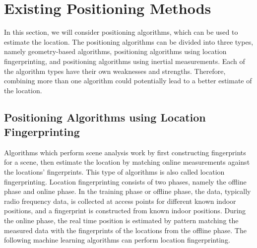 \section{Existing Positioning Methods} \label{sec:existingpositioningmethods}
In this section, we will consider positioning algorithms, which can be used to estimate the location. The positioning algorithms can be divided into three types, namely geometry-based algorithms, positioning algorithms using location fingerprinting, and positioning algorithms using inertial measurements. Each of the algorithm types have their own weaknesses and strengths. Therefore, combining more than one algorithm could potentially lead to a better estimate of the location. 

\subsection{Positioning Algorithms using Location Fingerprinting}
\label{sec:scene_analysis}
Algorithms which perform scene analysis work by first constructing fingerprints for a scene, then estimate the location by matching online measurements against the locations' fingerprints. This type of algorithms is also called location fingerprinting. Location fingerprinting consists of two phases, namely the offline phase and online phase. In the training phase or offline phase, the data, typically radio frequency data, is collected at access points for different known indoor positions, and a fingerprint is constructed from known indoor positions. During the online phase, the real time position is estimated by pattern matching the measured data with the fingerprints of the locations from the offline phase.\cite{IPS01} The following machine learning algorithms can perform location fingerprinting.

